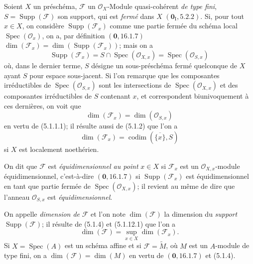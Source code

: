 \begin{env}[5.1.12]
\label{IV.2.5.1.12-fr}
Soient $X$ un préschéma, $\mathcal F$ un $\mathcal O_X$-Module
quasi-cohérent \emph{de type fini}, $S=\operatorname{Supp}(\mathcal F)$ son
support, qui est \emph{fermé} dans $X$ $(\mathbf{0}_{\mathrm I},5.2.2)$. Si, pour tout
$x\in X$, on considère $\operatorname{Supp}(\mathcal F_x)$ comme une partie
fermée du schéma local $\operatorname{Spec}(\mathcal O_x)$, on a, par
définition $(\mathbf{0},16.1.7)$
$\dim(\mathcal F_x)=\dim(\operatorname{Supp}(\mathcal F_x))$; mais on a
\[
\operatorname{Supp}(\mathcal F_x)
=S\cap\operatorname{Spec}(\mathcal O_{X,x})
=\operatorname{Spec}(\mathcal O_{S,x})
\]
où, dans le dernier terme, $S$ désigne un sous-préschéma fermé quelconque de
$X$ ayant $S$ pour espace sous-jacent. Si l'on remarque que les composantes
irréductibles de $\operatorname{Spec}(\mathcal O_{S,x})$ sont les
intersections de $\operatorname{Spec}(\mathcal O_{X,x})$ et des composantes
irréductibles de $S$ contenant $x$, et correspondent biunivoquement à ces
dernières, on voit que
\begin{equation}
\dim(\mathcal F_x)=\dim(\mathcal O_{S,x})
\tag{5.1.12.1}\label{IV.2.5.1.12.1-fr}
\end{equation}
en vertu de (5.1.1.1); il résulte aussi de (5.1.2) que l'on a
\begin{equation}
\dim(\mathcal F_x)=\operatorname{codim}(\overline{\{x\}},S)
\tag{5.1.12.2}\label{IV.2.5.1.12.2-fr}
\end{equation}
si $X$ est localement noethérien.

On dit que $\mathcal F$ est \emph{équidimensionnel au point} $x\in X$ si
$\mathcal F_x$ est un $\mathcal O_{X,x}$-module équidimensionnel,
c'est-à-dire $(\mathbf{0},16.1.7)$ si $\operatorname{Supp}(\mathcal F_x)$ est
équidimensionnel en tant que partie fermée de
$\operatorname{Spec}(\mathcal O_{X,x})$; il revient au même de dire que
l'anneau $\mathcal O_{S,x}$ est \emph{équidimensionnel}.

On appelle \emph{dimension de} $\mathcal F$ et l'on note $\dim(\mathcal F)$
la dimension du \emph{support} $\operatorname{Supp}(\mathcal F)$; il résulte
de (5.1.4) et (5.1.12.1) que l'on a
\begin{equation}
\dim(\mathcal F)=\sup_{x\in X}\dim(\mathcal F_x).
\tag{5.1.12.3}\label{IV.2.5.1.12.3-fr}
\end{equation}
Si $X=\operatorname{Spec}(A)$ est un schéma affine et si
$\mathcal F=\widetilde M$, où $M$ est un $A$-module de type fini, on a
$\dim(\mathcal F)=\dim(M)$ en vertu de $(\mathbf{0},16.1.7)$ et (5.1.4).
\end{env}

